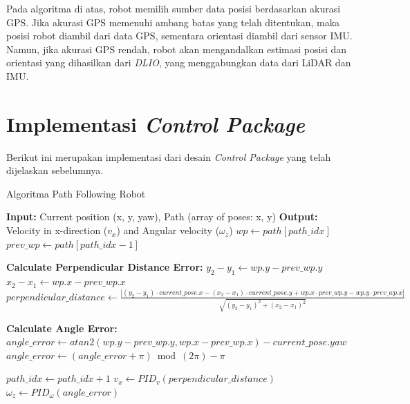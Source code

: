 Pada algoritma di atas, robot memilih sumber data posisi berdasarkan akurasi GPS. Jika akurasi GPS memenuhi ambang batas yang telah ditentukan, maka posisi robot diambil dari data GPS, sementara orientasi diambil dari sensor IMU. Namun, jika akurasi GPS rendah, robot akan mengandalkan estimasi posisi dan orientasi yang dihasilkan dari \emph{DLIO}, yang menggabungkan data dari LiDAR dan IMU.



\section{Implementasi \emph{Control Package}}
Berikut ini merupakan implementasi dari desain \emph{Control Package} yang telah dijelaskan sebelumnya.

\begin{algorithm}
  \caption{Algoritma Path Following Robot}
  \begin{algorithmic}[1]
  \State \textbf{Input:} Current position (x, y, yaw), Path (array of poses: x, y)
  \State \textbf{Output:} Velocity in x-direction ($v_x$) and Angular velocity ($\omega_z$)
      \State $wp \gets path[path\_idx]$
      \State $prev\_wp \gets path[path\_idx - 1]$
      
      \State \textbf{Calculate Perpendicular Distance Error:}
      \State $y_2 - y_1 \gets wp.y - prev\_wp.y$
      \State $x_2 - x_1 \gets wp.x - prev\_wp.x$
      \State $perpendicular\_distance \gets \frac{|(y_2 - y_1) \cdot current\_pose.x - (x_2 - x_1) \cdot current\_pose.y + wp.x \cdot prev\_wp.y - wp.y \cdot prev\_wp.x|}{\sqrt{(y_2 - y_1)^2 + (x_2 - x_1)^2}}$
      
      \State \textbf{Calculate Angle Error:}
      \State $angle\_error \gets atan2(wp.y - prev\_wp.y, wp.x - prev\_wp.x) - current\_pose.yaw$
      \State $angle\_error \gets (angle\_error + \pi) \bmod (2\pi) - \pi$ 


          \State $path\_idx \gets path\_idx + 1$
      \Else
          \State $v_x \gets PID_v (perpendicular\_distance)$
          \State $\omega_z \gets PID_\omega (angle\_error)$
      \EndIf
  \EndWhile
  \end{algorithmic}
\end{algorithm}


